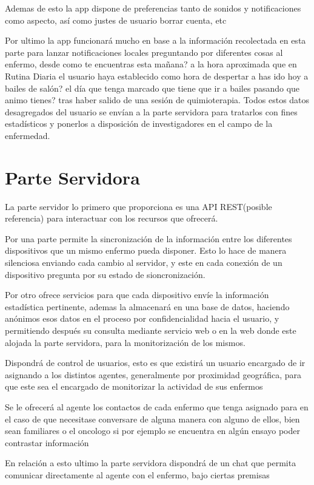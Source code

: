 \documentclass[b5paper,10pt,twoside]{book}
\begin{document}
	Ademas de esto la app dispone de preferencias tanto de sonidos y notificaciones como aspecto, así como justes de usuario borrar cuenta, etc
	
	Por ultimo la app funcionará mucho en base a la información recolectada en esta parte para lanzar notificaciones locales preguntando por diferentes cosas al enfermo, desde como te encuentras esta mañana? a la hora aproximada que en Rutina Diaria el usuario haya establecido como hora de despertar a has ido hoy a bailes de salón? el día que tenga marcado que tiene que ir a bailes pasando que animo tienes? tras haber salido de una sesión de quimioterapia. Todos estos datos desagregados del usuario se envían a la parte servidora para tratarlos con fines estadísticos y ponerlos a disposición de investigadores en el campo de la enfermedad.
	
	\section{Parte Servidora}
	
	La parte servidor lo primero que proporciona es una API REST(posible referencia) para interactuar con los recursos que ofrecerá.
	
	Por una parte permite la sincronización de la información entre los diferentes dispositivos  que un mismo enfermo pueda disponer. Esto lo hace de manera silenciosa enviando cada cambio al servidor, y este en cada conexión de un dispositivo pregunta por su estado de sioncronización.
	
	Por otro ofrece servicios para que cada dispositivo envíe la información estadística pertinente, ademas la almacenará en una base de datos, haciendo anónimos esos datos en el proceso por confidencialidad hacia el usuario, y permitiendo después su consulta mediante servicio web o en la web donde este alojada la parte servidora, para la monitorización de los mismos.
	
	Dispondrá de control de usuarios, esto es que existirá un usuario encargado de ir asignando a los distintos agentes, generalmente por proximidad geográfica, para que este sea el encargado de monitorizar la actividad de sus enfermos 
	
	Se le ofrecerá al agente los contactos de cada enfermo que tenga asignado para en el caso de que necesitase conversare de alguna manera con alguno de ellos, bien sean familiares o el oncologo si por ejemplo se encuentra en algún ensayo poder contrastar información
	
	En relación a esto ultimo la parte servidora dispondrá de un chat que permita comunicar directamente al agente con el enfermo, bajo ciertas premisas 
	
	
	
	
\end{document}
